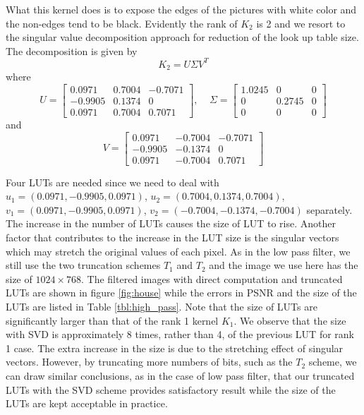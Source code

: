\documentclass[12pt]{amsart}
\theoremstyle{definition}
\theoremstyle{remark}
\numberwithin{thm}{section}
\begin{document}
What this kernel does is to expose the edges of the pictures with white  color and the non-edges tend to be black. Evidently the rank of $K_2$ is 2 and we resort to the singular value decomposition approach for reduction of the look up table size. The decomposition is given by 
$$
K_2=U\Sigma V^T
$$
where
$$
U=
\begin{bmatrix}
 0.0971 & 0.7004 & -0.7071\\
-0.9905 & 0.1374 & 0\\
 0.0971 & 0.7004 & 0.7071
\end{bmatrix}
, \ \ \ \ \ \Sigma=
\begin{bmatrix}
1.0245 & 0 & 0\\
0& 0.2745 & 0\\
0 & 0 & 0
\end{bmatrix}
$$
and
$$
V=
\begin{bmatrix}
 0.0971 & -0.7004 & -0.7071\\
-0.9905 & -0.1374 & 0\\
 0.0971 & -0.7004 & 0.7071
\end{bmatrix}
$$

Four LUTs are needed since we need to deal with $u_1=(0.0971,-0.9905,0.0971)$, $u_2=(0.7004,0.1374,0.7004)$, $v_1=(0.0971,-0.9905,0.0971)$, $v_2=(-0.7004,-0.1374,-0.7004)$ separately. The increase in the number of LUTs causes the size of LUT to rise. Another factor that contributes to the increase in the LUT size is the singular vectors which may stretch the original values of each pixel. As in the low pass filter, we still use the two truncation schemes $T_1$ and $T_2$ and the image we use here has the size of $1024\times 768$. The filtered images with direct computation and truncated LUTs are shown in figure \ref{fig:house} while the errors in PSNR and the size of the LUTs are listed in Table \ref{tbl:high_pass}. 
Note that the size of LUTs are significantly larger than that of the rank 1 kernel $K_1$. We observe that the size with SVD is approximately 8 times, rather than 4, of the previous LUT for rank 1 case. The extra increase in the size is due to the stretching effect of singular vectors. However, by truncating more numbers of bits, such as the $T_2$ scheme, we can draw similar conclusions, as in the case of low pass filter, that our truncated LUTs with the SVD scheme provides satisfactory result while the size of the LUTs are kept acceptable in practice. 
\end{document}
